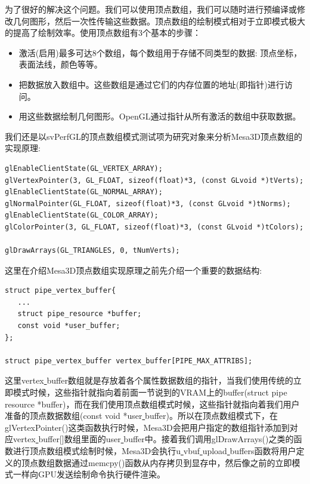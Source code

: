 为了很好的解决这个问题。我们可以使用顶点数组，我们可以随时进行预编译或修改几何图形，然后一次性传输这些数据。顶点数组的绘制模式相对于立即模式极大的提高了绘制效率。使用顶点数组有3个基本的步骤：

\begin{itemize}
\item{} 激活(启用)最多可达8个数组，每个数组用于存储不同类型的数据: 顶点坐标，表面法线，颜色等等。
\item{} 把数据放入数组中。这些数组是通过它们的内存位置的地址(即指针)进行访问。
\item{} 用这些数据绘制几何图形。OpenGL通过指针从所有激活的数组中获取数据。
\end{itemize}

我们还是以svPerfGL的顶点数组模式测试项为研究对象来分析Mesa3D顶点数组的实现原理:

\begin{lstlisting}
glEnableClientState(GL_VERTEX_ARRAY);
glVertexPointer(3, GL_FLOAT, sizeof(float)*3, (const GLvoid *)tVerts);
glEnableClientState(GL_NORMAL_ARRAY);
glNormalPointer(GL_FLOAT, sizeof(float)*3, (const GLvoid *)tNorms);
glEnableClientState(GL_COLOR_ARRAY);
glColorPointer(3, GL_FLOAT, sizeof(float)*3, (const GLvoid *)tColors);

glDrawArrays(GL_TRIANGLES, 0, tNumVerts);
\end{lstlisting}

这里在介绍Mesa3D顶点数组实现原理之前先介绍一个重要的数据结构:
\begin{lstlisting}
struct pipe_vertex_buffer{
   ...
   struct pipe_resource *buffer; 
   const void *user_buffer;
};

struct pipe_vertex_buffer vertex_buffer[PIPE_MAX_ATTRIBS];
\end{lstlisting}
这里vertex\underline{ }buffer数组就是存放着各个属性数据数组的指针，当我们使用传统的立即模式时候，这些指针就指向着前面一节说到的VRAM上的buffer(struct pipe\underline{ }resource *buffer)，而在我们使用顶点数组模式时候，这些指针就指向着我们用户准备的顶点数据数组(const void *user\underline{ }buffer)。所以在顶点数组模式下，在glVertexPointer()这类函数执行时候，Mesa3D会把用户指定的数组指针添加到对应vertex\underline{ }buffer[]数组里面的user\underline{ }buffer中。接着我们调用glDrawArrays()之类的函数进行顶点数组模式绘制时候，Mesa3D会执行u\underline{ }vbuf\underline{ }upload\underline{ }buffers函数将用户定义的顶点数组数据通过memcpy()函数从内存拷贝到显存中，然后像之前的立即模式一样向GPU发送绘制命令执行硬件渲染。

